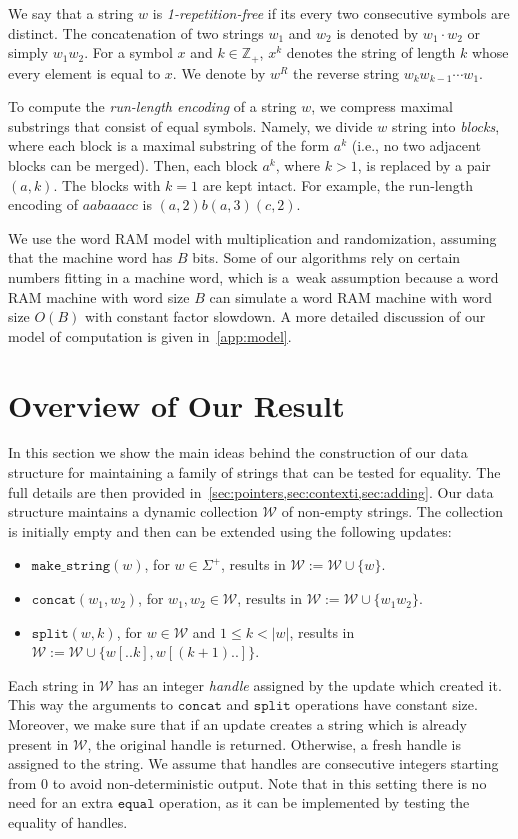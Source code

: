 \documentclass[a4paper]{article}
\theoremstyle{remark}
\newcommand{\makeop}{\mathtt{make\_string}}
\newcommand{\eqop}{\mathtt{equal}}
\newcommand{\concop}{\mathtt{concat}}
\newcommand{\splitop}{\mathtt{split}}
\newcommand{\str}{w}
\newcommand{\mword}{B}
\newcommand{\coll}{\mathcal{W}}
\begin{document}
We say that a string $\str$ is \emph{1-repetition-free} if its every two consecutive symbols are distinct.
The concatenation of two strings $\str_1$ and $\str_2$ is denoted by $\str_1 \cdot \str_2$ or simply $\str_1 \str_2$.
For a symbol $x$ and $k \in \mathbb{Z}_{+}$, $x^k$ denotes the string of length $k$ whose every element is equal to $x$.
We denote by $\str^R$ the reverse string $w_kw_{k-1}\cdots w_1$.





To compute the \emph{run-length encoding} of a string $\str$, we compress maximal substrings that consist of equal symbols.
Namely, we divide $\str$ string into \emph{blocks}, where each block is a maximal substring of the form $a^k$ (i.e., no two adjacent blocks can be merged).
Then, each block $a^k$, where $k > 1$, is replaced by a pair $(a, k)$.
The blocks with $k=1$ are kept intact.
For example, the run-length encoding of $aabaaacc$ is $(a,2)b(a,3)(c,2)$.

We use the word RAM model with multiplication and randomization, assuming that the machine word has $\mword$ bits.
Some of our algorithms rely on certain numbers fitting in a machine word, which is a~weak
assumption because a word RAM machine with word size $\mword$ can simulate a word RAM machine
with word size $O(\mword)$ with constant factor slowdown.
A more detailed discussion of our model of computation is given in~\cref{app:model}.

\section{Overview of Our Result}\label{sec:collection}
In this section we show the main ideas behind the construction of our data structure
for maintaining a family of strings that can be tested for equality.
The full details are then provided in~\cref{sec:pointers,sec:contexti,sec:adding}.
Our data structure maintains a dynamic collection $\coll$ of non-empty strings.
The collection is initially empty and then can be extended using the following updates:
\begin{itemize}
  \item $\makeop(\str)$, for $\str\in \Sigma^+$, results in $\coll:=\coll\cup \{\str\}$.
   \item $\concop(\str_1,\str_2)$, for $\str_1,\str_2\in \coll$, results in $\coll:=\coll\cup \{\str_1\str_2\}$.
  \item $\splitop(\str,k)$, for $\str\in \coll$ and $1\leq k<|\str|$, results in
    $\coll:=\coll\cup \{\str[..k], \str[(k + 1)..]\}$.
\end{itemize}
Each string in $\coll$ has an integer \emph{handle} assigned by the update which created it.
This way the arguments to $\concop$ and $\splitop$ operations have constant size.
Moreover, we make sure that if an update creates a string which is already present in $\coll$, the original handle is returned.
Otherwise, a fresh handle is assigned to the string. We assume that handles are consecutive integers starting from $0$
to avoid non-deterministic output.
Note that in this setting there is no need for an extra $\eqop$ operation, as it can be implemented by
testing the equality of handles.
\end{document}
